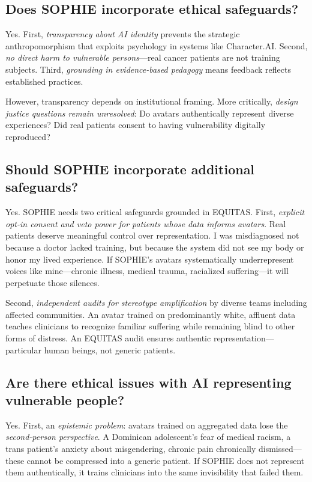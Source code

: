 \documentclass[12pt,twoside]{article}
\begin{document}
\subsection*{Does SOPHIE incorporate ethical safeguards?}

Yes. First, \emph{transparency about AI identity} prevents the strategic anthropomorphism that exploits psychology in systems like Character.AI. Second, \emph{no direct harm to vulnerable persons}—real cancer patients are not training subjects. Third, \emph{grounding in evidence-based pedagogy} means feedback reflects established practices.

However, transparency depends on institutional framing. More critically, \emph{design justice questions remain unresolved}: Do avatars authentically represent diverse experiences? Did real patients consent to having vulnerability digitally reproduced?

\subsection*{Should SOPHIE incorporate additional safeguards?}

Yes. SOPHIE needs two critical safeguards grounded in EQUITAS. First, \emph{explicit opt-in consent and veto power for patients whose data informs avatars}. Real patients deserve meaningful control over representation. I was misdiagnosed not because a doctor lacked training, but because the system did not see my body or honor my lived experience. If SOPHIE's avatars systematically underrepresent voices like mine—chronic illness, medical trauma, racialized suffering—it will perpetuate those silences.

Second, \emph{independent audits for stereotype amplification} by diverse teams including affected communities. An avatar trained on predominantly white, affluent data teaches clinicians to recognize familiar suffering while remaining blind to other forms of distress. An EQUITAS audit ensures authentic representation—particular human beings, not generic patients.

\subsection*{Are there ethical issues with AI representing vulnerable people?}

Yes. First, an \emph{epistemic problem}: avatars trained on aggregated data lose the \emph{second-person perspective}. A Dominican adolescent's fear of medical racism, a trans patient's anxiety about misgendering, chronic pain chronically dismissed—these cannot be compressed into a generic patient. If SOPHIE does not represent them authentically, it trains clinicians into the same invisibility that failed them.
\end{document}
